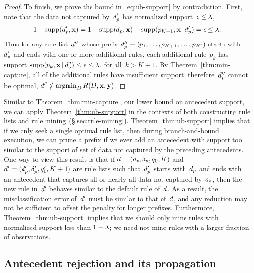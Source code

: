 \begin{proof}
To finish, we prove the bound in~\eqref{eq:ub-support} by contradiction.
%
First, note that the data not captured by~$d_p'$
has normalized support~${\epsilon \le {\lambda}}$, \ie
\begin{align}
1 - \Supp(\Prefix', \x) = 1 - \Supp(\Prefix, \x) - \Supp(p_{K+1}, \x \given \Prefix') = \epsilon \le \Reg.
\end{align}
Thus for any rule list~${d}''$ whose prefix
$d_p'' = (p_1, \dots, p_{K+1}, \dots, p_{K'})$ starts
with~$d_p'$ and ends with one or more additional rules,
each additional rule~$p_k$ has support
${\textnormal{supp}(p_k, \mathbf{x} \,|\, d_p'') \le \epsilon \le {\lambda}}$,
for all~${k > K+1}$.
%
By Theorem~\ref{thm:min-capture},
all of the additional rules have insufficient support,
therefore~$d_p''$ cannot be optimal,
\ie ${{d}'' \notin \operatorname*{argmin}_{{D}} R({D}, \mathbf{x}, \mathbf{y})}$.
\end{proof}

Similar to Theorem~\ref{thm:min-capture}, our lower bound on
antecedent support, we can apply Theorem~\ref{thm:ub-support}
in the contexts of both constructing rule lists and
rule mining~(\S\ref{sec:rule-mining}).
%
Theorem~\ref{thm:ub-support} implies that if we only seek a single
optimal rule list, then during branch-and-bound execution,
we can prune a prefix if we ever add an antecedent with support
too similar to the support of set of data not captured by the
preceding antecedents.
%
One way to view this result is that if
${{d} = (d_p, \delta_p, q_0, K)}$
and ${{d}' = (d_p', \delta_p', q_0', K + 1)}$
are rule lists such that~$d_p'$ starts with~$d_p$
and ends with an antecedent that captures all or nearly all
data not captured by~$d_p$, then the new rule in~${d}'$
behaves similar to the default rule of~${d}$.
%
As a result, the misclassification error of~${d}'$ must be
similar to that of~${d}$, and any reduction may not be
sufficient to offset the penalty for longer prefixes.
%
Furthermore, Theorem~\ref{thm:ub-support} implies that we should
only mine rules with normalized support less than ${1 - {\lambda}}$;
we need not mine rules with a larger fraction of observations.

\subsection{Antecedent rejection and its propagation}
\label{sec:reject}

